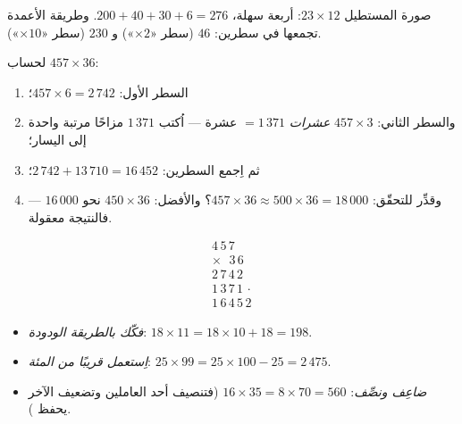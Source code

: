 \begin{omfigure}

{\small صورة المستطيل  $23 \times 12$: أربعة  سهلة،
$200 + 40 + 30 + 6 = 276$. وطريقة الأعمدة تجمعها في سطرين:
$46$ (سطر «$\times 2$») و $230$ (سطر «$\times 10$»).}
\end{omfigure}

\begin{method}\label{met:g4:mult:column}
لحساب $457 \times 36$:
\begin{enumerate}
  \item السطر الأول: $457 \times 6 = 2\,742$؛
  \item والسطر الثاني: $457 \times 3$ \emph{عشرات} $= 1\,371$
        عشرة --- اُكتب $1\,371$ مزاحًا مرتبة واحدة إلى اليسار؛
  \item ثم اِجمع السطرين: $2\,742 + 13\,710 = 16\,452$؛
  \item وقدِّر للتحقّق: $457 \times 36 \approx 500 \times 36
        = 18\,000$؟ والأفضل: $450 \times 36$ نحو $16\,000$ ---
        فالنتيجة معقولة.
\end{enumerate}
\[
\begin{array}{r}
4\,5\,7 \\
\times\ \ \,3\,6 \\
\hline
2\,7\,4\,2 \\
1\,3\,7\,1\,\cdot \\
\hline
1\,6\,4\,5\,2
\end{array}
\]
\end{method}

\begin{example}\label{ex:g4:mult:tricks}
\begin{itemize}
  \item \emph{فكّك بالطريقة الودودة}: $18 \times 11 = 18 \times 10
        + 18 = 198$.
  \item \emph{اِستعمل قريبًا من المئة}: $25 \times 99 = 25 \times 100 -
        25 = 2\,475$.
  \item \emph{ضاعِف ونصِّف}: $16 \times 35 = 8 \times 70 =
        560$ (فتنصيف أحد العاملين وتضعيف الآخر يحفظ
        ).
\end{itemize}
\end{example}

